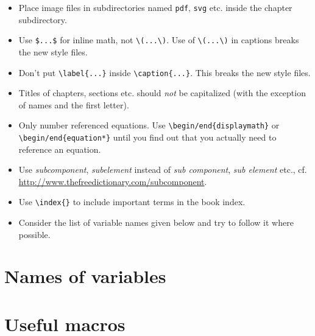 \documentclass{article}
\begin{document}
\begin{itemize}
  Where possible, use \verb|width=\smallfig| or \verb|width=\largefig|
  to specify image sizes.
\item
  Place image files in subdirectories named \verb|pdf|, \verb|svg|
  etc. inside the chapter subdirectory.
\item
  Use \verb|$...$| for inline math, not \verb|\(...\)|. Use of
  \verb|\(...\)| in captions breaks the new style files.
\item
  Don't put \verb|\label{...}| inside \verb|\caption{...}|. This
  breaks the new style files.
\item
  Titles of chapters, sections etc. should \emph{not} be capitalized
  (with the exception of names and the first letter).
\item
  Only number referenced equations. Use \verb|\begin/end{displaymath}|
  or \verb|\begin/end{equation*}| until you find out that you actually
  need to reference an equation.
\item
  Use \emph{subcomponent}, \emph{subelement} instead of \emph{sub
    component}, \emph{sub element} etc.,
  cf. \url{http://www.thefreedictionary.com/subcomponent}.
\item
  Use \verb|\index{}| to include important terms in the book index.
\item
  Consider the list of variable names given below and try to follow it
  where possible.
\end{itemize}

\section*{Names of variables}


\section*{Useful macros}
\end{document}
